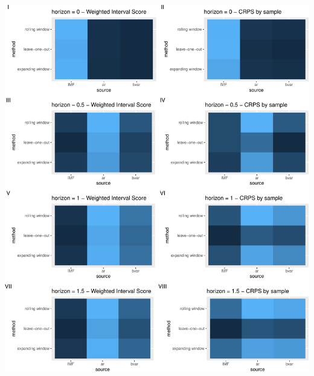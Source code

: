\documentclass[
]{article}
\begin{document}
\includegraphics{manuscript_files/figure-latex/gdptileplot-1.pdf}
\end{document}
